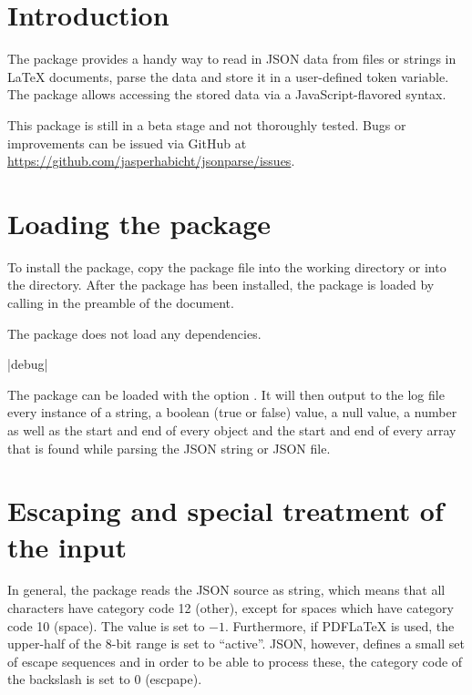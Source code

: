 \documentclass[a4paper]{article}
\begin{document}
\printdoctitle

\bigskip

\section{Introduction}

The  package provides a handy way to read in JSON data from files or strings in LaTeX documents, parse the data and store it in a user-defined token variable. The package allows accessing the stored data via a JavaScript-flavored syntax.

This package is still in a beta stage and not thoroughly tested. Bugs or improvements can be issued via GitHub at \url{https://github.com/jasperhabicht/jsonparse/issues}.

\section{Loading the package}

To install the package, copy the package file  into the working directory or into the  directory. After the package has been installed, the  package is loaded by calling \macro{\usepackage{jsonparse}} in the preamble of the document. 

The package does not load any dependencies.

\begin{macrodef}
|debug|
\end{macrodef}
The package can be loaded with the option . It will then output to the log file every instance of a string, a boolean (true or false) value, a null value, a number as well as the start and end of every object and the start and end of every array that is found while parsing the JSON string or JSON file.

\section{Escaping and special treatment of the input}\label{sec:escaping}

In general, the package reads the JSON source as string, which means that all characters have category code 12 (other), except for spaces which have category code 10 (space). The \macro{\endlinechar} value is set to $-1$. Furthermore, if PDFLaTeX is used, the upper-half of the 8-bit range is set to ``active''. JSON, however, defines a small set of escape sequences and in order to be able to process these, the category code of the backslash is set to 0 (escpape). 
\end{document}
